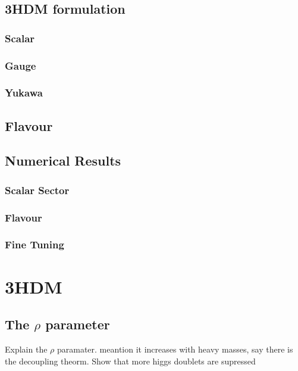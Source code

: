 \section{3HDM formulation} 

\subsection{Scalar}

\subsection{Gauge} 

\subsection{Yukawa}

\section{Flavour}

\section{Numerical Results}

\subsection{Scalar Sector}

\subsection{Flavour}

\subsection{Fine Tuning}

\chapter{3HDM}

\section{ The $\rho$ parameter }

{ \color{green} Explain the $\rho$ paramater. meantion it increases with heavy masses, say there is the decoupling theorm. Show that more higgs doublets are supressed  } 

